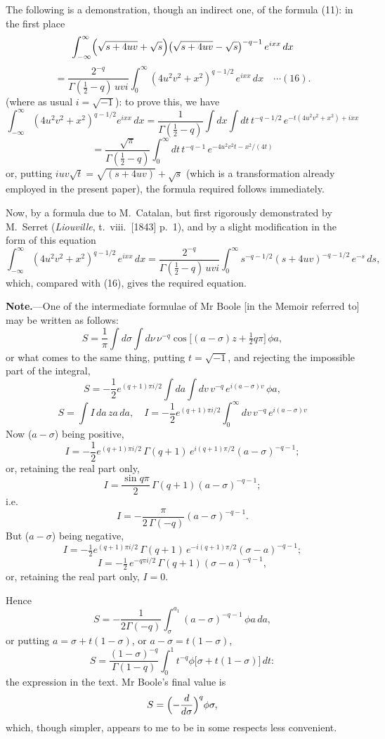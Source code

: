 \documentclass[12pt,a4paper]{article}
\begin{document}
The following is a demonstration, though an indirect one, of the formula (11): in the first place
\[
\int_{-\infty}^{\infty}\Bigl(\sqrt{s + 4uv} + \sqrt{s}\Bigr)\bigl(\sqrt{s + 4uv} - \sqrt{s}\bigr)^{-q-1}\,e^{ixx}\,dx
\]
\[
= \frac{2^{-q}}{\Gamma(\tfrac12 - q)\,uvi}\int_0^\infty (4u^2v^2 + x^2)^{q - 1/2}\,e^{ixx}\,dx \quad\cdots(16).
\]
(where as usual $i = \sqrt{-1}$): to prove this, we have
\[
\int_{-\infty}^{\infty}(4u^2v^2 + x^2)^{q-1/2}e^{ixx}\,dx = \frac{1}{\Gamma(\tfrac12 - q)}\int dx \int dt\, t^{-q-1/2}\,e^{-t(4u^2v^2 + x^2) + ixx}
\]
\[
= \frac{\sqrt{\pi}}{\Gamma(\tfrac12 - q)}\int_0^\infty dt\, t^{-q-1}\,e^{-4u^2v^2 t - x^2/(4t)}
\]
or, putting $iuv\sqrt{t} = \sqrt{(s + 4uv)} + \sqrt{s}$ (which is a transformation already employed in the present paper), the formula required follows immediately.

Now, by a formula due to M.\ Catalan, but first rigorously demonstrated by M.\ Serret (\emph{Liouville}, t.~viii.~[1843] p.~1), and by a slight modification in the form of this equation
\[
\int_{-\infty}^{\infty}(4u^2 v^2 + x^2)^{q-1/2}\,e^{ixx}\,dx = \frac{2^{-q}}{\Gamma(\tfrac12 - q)\,uvi}\int_0^\infty s^{-q-1/2}(s + 4uv)^{-q-1/2}\,e^{-s}\,ds,
\]
which, compared with (16), gives the required equation.

\bigskip
\textbf{Note.}---One of the intermediate formulae of Mr Boole [in the Memoir referred to] may be written as follows:
\[
S = \frac{1}{\pi}\int d\sigma \int d\nu\,\nu^{-q}\cos\bigl[(a - \sigma)z + \tfrac12 q\pi\bigr]\,\phi a,
\]
or what comes to the same thing, putting $t = \sqrt{-1}$, and rejecting the impossible part of the integral,
\[
S = -\frac{1}{2}e^{(q+1)\pi i/2}\int da \int dv\,v^{-q}\,e^{i(a - \sigma)v}\,\phi a,
\]
\[
S = \int I\,da\,za\,da,\quad I = -\frac12 e^{(q+1)\pi i/2}\int_0^\infty dv\,v^{-q}\,e^{i(a - \sigma)v}
\]
Now ($a - \sigma$) being positive,
\[
I = -\frac12 e^{(q+1)\pi i/2}\,\Gamma(q+1)\,e^{i(q+1)\pi/2}(a - \sigma)^{-q-1};
\]
or, retaining the real part only,
\[
I = \frac{\sin q\pi}{2}\,\Gamma(q+1)(a - \sigma)^{-q-1};
\]
i.e.
\[
I = -\frac{\pi}{2\,\Gamma(-q)}(a - \sigma)^{-q-1}.
\]
But ($a - \sigma$) being negative,
\[
I = -\tfrac12 e^{(q+1)\pi i/2}\,\Gamma(q+1)\,e^{-i(q+1)\pi/2}(\sigma - a)^{-q-1};
\]
\[
I = -\tfrac12\,e^{-q\pi i/2}\,\Gamma(q+1)(\sigma - a)^{-q-1},
\]
or, retaining the real part only, $I = 0$.

Hence
\[
S = -\frac{1}{2\Gamma(-q)}\int_{\sigma}^{a_1}(a - \sigma)^{-q-1}\,\phi a\,da,
\]
or putting $a = \sigma + t(1 - \sigma)$, or $a - \sigma = t(1 - \sigma)$,
\[
S = \frac{(1-\sigma)^{-q}}{\Gamma(1-q)}\int_0^1 t^{-q}\phi\bigl[\sigma + t(1 - \sigma)\bigr]\,dt:
\]
the expression in the text. Mr Boole's final value is
\[
S = \Bigl(-\frac{d}{d\sigma}\Bigr)^q\phi\sigma,
\]
which, though simpler, appears to me to be in some respects less convenient.
\end{document}
